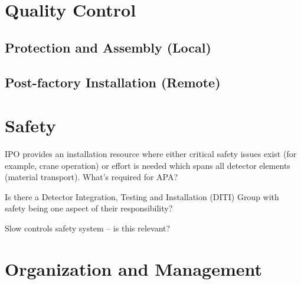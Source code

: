\section{Quality Control}
\label{sec:fdsp-apa-qc}

\subsection{Protection and Assembly (Local)}
\label{sec:fdsp-apa-qc-local}


\subsection{Post-factory Installation (Remote)}
\label{sec:fdsp-apa-qc-remote}



\section{Safety}
\label{sec:fdsp-apa-safety}


IPO provides an installation resource where either critical safety issues exist (for example,  crane	
operation) or effort is needed which spans all	detector elements (material transport). What's required for APA?

Is there a Detector Integration, Testing and Installation (DITI) Group with safety being one aspect of their responsibility?

Slow controls safety system -- is this relevant?






\section{Organization and Management}
\label{sec:fdsp-apa-org}

